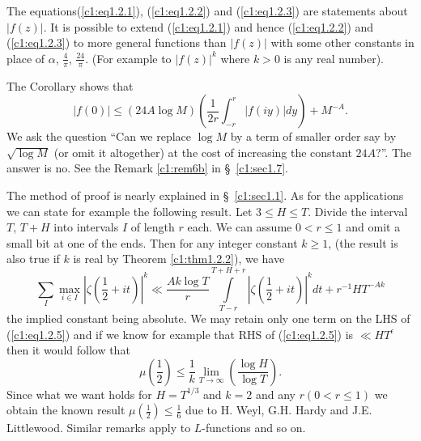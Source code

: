 \setcounter{remark}{0}
\begin{remark}\label{c1:rem1}
The equations\pageoriginale (\ref{c1:eq1.2.1}), (\ref{c1:eq1.2.2}) and (\ref{c1:eq1.2.3}) are statements about $|f(z)|$. It is possible to extend (\ref{c1:eq1.2.1}) and hence (\ref{c1:eq1.2.2}) and (\ref{c1:eq1.2.3}) to more general functions than $|f(z)|$ with some other constants in place of $\alpha$, $\frac{4}{\pi}$, $\frac{24}{\pi}$. (For example to $|f(z)|^k$ where $k>0$ is any real number). 
\end{remark}

\begin{remark}\label{c1:rem2}
The Corollary shows that
\begin{equation*}
|f(0)| \leq (24 A \log M) \left(\frac{1}{2r} \int^r_{-r} |f(iy)| dy \right) +M^{-A}. \tag{1.2.4}\label{c1:eq1.2.4}
\end{equation*}
We ask the question ``Can we replace $\log M$ by a term of smaller order say by $\sqrt{\log M}$ (or omit it altogether) at the cost of increasing the constant $24A$?''. The answer is no. See the Remark \ref{c1:rem6b} in \S\ \ref{c1:sec1.7}.
\end{remark}

\begin{remark}\label{c1:rem3}
The method of proof is nearly explained in \S\ \ref{c1:sec1.1}. As for the applications we can state for example the following result. Let $3 \leq H \leq T$. Divide the interval $T$, $T+H$ into intervals $I$ of length $r$ each. We can assume $0 < r \leq 1$ and omit a small bit at one of the ends. Then for any integer constant $k \geq 1$, (the result is also true if $k$ is real by Theorem  \ref{c1:thm1.2.2}), we have
\begin{equation*}
\sum\limits_I \max_{i \in I} |\zeta \left(\frac{1}{2} + it \right)|^k \ll \frac{Ak \log T}{r} \int\limits^{T+H+r}_{T-r} \left|\zeta\left(\frac{1}{2} +it \right) \right|^k dt + r^{-1} HT^{-Ak} \tag{1.2.5}\label{c1:eq1.2.5}
\end{equation*}
the implied constant being absolute. We may retain only one term on the LHS of (\ref{c1:eq1.2.5}) and if we know for example that RHS of (\ref{c1:eq1.2.5}) is $\ll HT^\epsilon$ then it would follow that
\begin{equation*}
\mu \left(\frac{1}{2} \right) \leq \frac{1}{k} \lim\limits_{T \to \infty} \left( \frac{\log H}{\log T}\right). \tag{1.2.6}\label{c1:eq1.2.6}
\end{equation*}
Since what we want holds for $H = T^{1/3}$ and $k = 2$ and any $r(0< r \leq 1)$ we obtain the known result $\mu(\frac{1}{2}) \leq \frac{1}{6}$ due to H. Weyl, G.H. Hardy and J.E. Littlewood. Similar remarks apply to $L$-functions and so on.
\end{remark}

